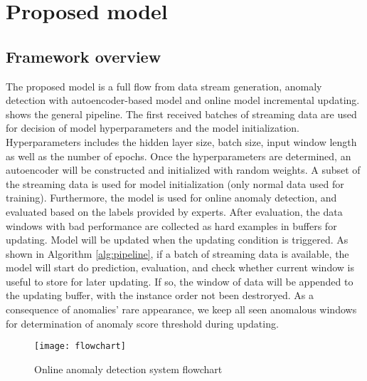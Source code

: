\chapter{Proposed model}
\label{chap:Proposedmodel}

\section{Framework overview}
\label{sec:framework}

The proposed model is a full flow from data stream generation, anomaly detection with autoencoder-based model and online model incremental updating.  shows the general pipeline. The first received batches of streaming data are used for decision of model hyperparameters and the model initialization. Hyperparameters includes the hidden layer size, batch size, input window length as well as the number of epochs. Once the hyperparameters are determined, an autoencoder will be constructed and initialized with random weights. A subset of the streaming data is used for model initialization (only normal data used for training). Furthermore, the model is used for online anomaly detection, and evaluated based on the labels provided by experts. After evaluation, the data windows with bad performance are collected as hard examples in buffers for updating. Model will be updated when the updating condition is triggered. As shown in Algorithm \ref{alg:pipeline}, if a batch of streaming data is available, the model will start do prediction, evaluation, and check whether current window is useful to store for later updating. If so, the window of data will be appended to the updating buffer, with the instance order not been destroryed. As a consequence of anomalies' rare appearance, we keep all seen anomalous windows for determination of anomaly score threshold during updating. 


\begin{figure}[h]
\centering
\texttt{[image: flowchart]}
\caption[Online anomaly detection system flowchart]{Online anomaly detection system flowchart}
\label{fig:flowchart}
\end{figure}

